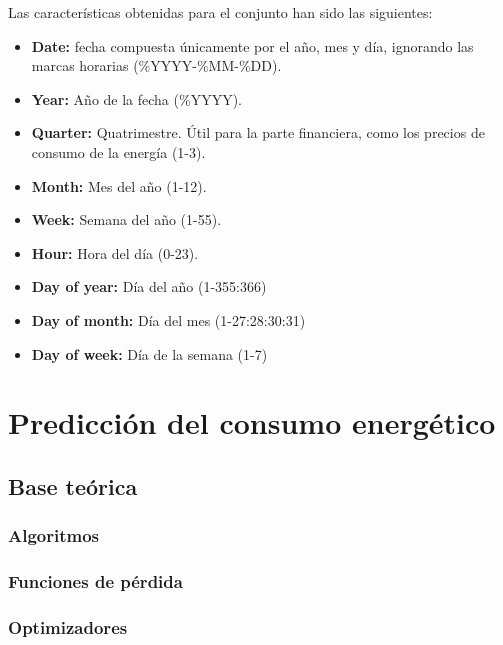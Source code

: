 \documentclass[a4paper,12pt]{article}
\begin{document}
Las características obtenidas para el conjunto han sido 
las siguientes:
\begin{itemize}
    \item \textbf{Date:} fecha compuesta únicamente
    por el año, mes y día, ignorando las marcas horarias
    (\%YYYY-\%MM-\%DD).

    \item \textbf{Year:} Año de la fecha (\%YYYY).

    \item \textbf{Quarter:} Quatrimestre. Útil 
    para la parte financiera, como los precios de
    consumo de la energía (1-3).

    \item \textbf{Month:} Mes del año (1-12).

    \item \textbf{Week:} Semana del año (1-55).
    
    \item \textbf{Hour:} Hora del día (0-23).

    \item \textbf{Day of year:} Día del año (1-355:366)

    \item \textbf{Day of month:} Día del mes (1-27:28:30:31)

    \item \textbf{Day of week:} Día de la semana (1-7)
\end{itemize}

\section{Predicción del consumo energético}

\subsection{Base teórica}

\subsubsection{Algoritmos}

\subsubsection{Funciones de pérdida}

\subsubsection{Optimizadores}
\end{document}
